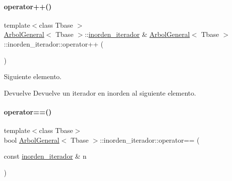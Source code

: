 \hypertarget{classArbolGeneral_1_1inorden__iterador_adae1260c6d315f40e7e7128145d5ec08}{}\label{classArbolGeneral_1_1inorden__iterador_adae1260c6d315f40e7e7128145d5ec08} 
\paragraph{\texorpdfstring{operator++()}{operator++()}}
{\footnotesize\ttfamily template$<$class Tbase $>$ \\
\hyperlink{classArbolGeneral}{Arbol\+General}$<$ Tbase $>$\+::\hyperlink{classArbolGeneral_1_1inorden__iterador}{inorden\+\_\+iterador} \& \hyperlink{classArbolGeneral}{Arbol\+General}$<$ Tbase $>$\+::inorden\+\_\+iterador\+::operator++ (\begin{DoxyParamCaption}{ }\end{DoxyParamCaption})}



Siguiente elemento. 

\begin{DoxyReturn}{Devuelve}
Devuelve un iterador en inorden al siguiente elemento. 
\end{DoxyReturn}
\hypertarget{classArbolGeneral_1_1inorden__iterador_af19eeb8f37343e3f1c472f3f47818cac}{}\label{classArbolGeneral_1_1inorden__iterador_af19eeb8f37343e3f1c472f3f47818cac} 
\paragraph{\texorpdfstring{operator==()}{operator==()}}
{\footnotesize\ttfamily template$<$class Tbase$>$ \\
bool \hyperlink{classArbolGeneral}{Arbol\+General}$<$ Tbase $>$\+::inorden\+\_\+iterador\+::operator== (\begin{DoxyParamCaption}\item[{const \hyperlink{classArbolGeneral_1_1inorden__iterador}{inorden\+\_\+iterador} \&}]{n }\end{DoxyParamCaption})\hspace{0.3cm}{\ttfamily [inline]}}



